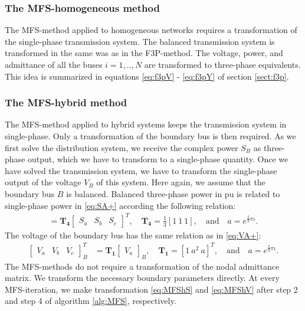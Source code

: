 \documentclass[10pt,journal]{article}
\begin{document}
\subsubsection{{The MFS-homogeneous method}}
The MFS-method applied to homogeneous networks requires a transformation of the single-phase transmission system. The balanced transmission system is transformed in the same was as in the F3P-method. The voltage, power, and admittance of all the buses $i=1,..,N$ are transformed to three-phase equivalents. This idea is summarized in equations \eqref{eq:f3pV} - \eqref{eq:f3pY} of section \ref{sect:f3p}.  

\subsubsection{{The MFS-hybrid method}}
The MFS-method applied to hybrid systems keeps the transmission system in single-phase. Only a transformation of the boundary bus is then required. \newline
As we first solve the distribution system, we receive the complex power $S_B$ as three-phase output, which we have to transform to a single-phase quantity. Once we have solved the transmission system, we have to transform the single-phase output of the voltage $V_B$ of this system. Here again, we assume that the boundary bus $B$ is balanced. Balanced three-phase power in pu is related to single-phase power in \eqref{eq:SA+} according the following relation:
\begin{align}
    [S_a] = \mathbf{T_4}\begin{bmatrix}S_a & S_b & S_c \end{bmatrix}^T, \quad \mathbf{T_4}= \frac{1}{3}\left[1 \ 1 \ 1 \right],\quad\mbox{and}\quad a = e^{\frac{2}{3}\pi\iota}.
\label{eq:MFShS}\end{align}
The voltage of the boundary bus has the same relation as in \eqref{eq:VA+}: 
\begin{align}
    \begin{bmatrix}V_a & V_b & V_c\end{bmatrix}^T_B &= \mathbf{T_1}\begin{bmatrix}V_a\end{bmatrix}_B,\quad 
     \mathbf{T_1} = [1\ a^2\ a]^T,\quad\mbox{and}\quad a = e^{\frac{2}{3}\pi\iota}.\label{eq:MFShV}
    \end{align}
The MFS-methods do not require a transformation of the nodal admittance matrix. We transform the necessary boundary parameters directly. At every MFS-iteration, we make transformation \eqref{eq:MFShS} and \eqref{eq:MFShV} after step 2 and step 4 of algorithm \ref{alg:MFS}, respectively. 
\end{document}
